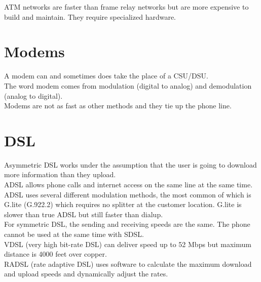 \documentclass{article}
\begin{document}
ATM networks are faster than frame relay networks but are more expensive to
build and maintain. They require specialized hardware.

\section{Modems}

A modem can and sometimes does take the place of a CSU/DSU.\\

The word modem comes from modulation (digital to analog) and demodulation
(analog to digital).\\

Modems are not as fast as other methods and they tie up the phone line.

\section{DSL}

Asymmetric DSL works under the assumption that the user is going to download
more information than they upload.\\

ADSL allows phone calls and internet access on the same line at the same time.\\

ADSL uses several different modulation methods, the most common of which
is G.lite (G.922.2) which requires no splitter at the customer location.
G.lite is slower than true ADSL but still faster than dialup.\\

For symmetric DSL, the sending and receiving speeds are the same. The
phone cannot be used at the same time with SDSL.\\

VDSL (very high bit-rate DSL) can deliver speed up to 52 Mbps but maximum
distance is 4000 feet over copper.\\

RADSL (rate adaptive DSL) uses software to calculate the maximum download
and upload speeds and dynamically adjust the rates.
\end{document}
